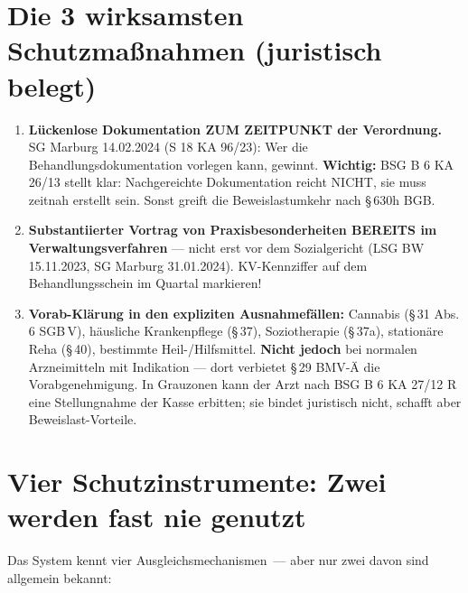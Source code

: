 \documentclass[a4paper]{umbruch-position}
\begin{document}
\newpage
\section{Die 3 wirksamsten Schutzma\ss{}nahmen (juristisch belegt)}

\begin{enumerate}
    \item \textbf{L\"uckenlose Dokumentation ZUM ZEITPUNKT der Verordnung.} SG Marburg 14.02.2024 (S 18 KA 96/23): Wer die Behandlungsdokumentation vorlegen kann, gewinnt. \textbf{Wichtig:} BSG B 6 KA 26/13 stellt klar: Nachgereichte Dokumentation reicht NICHT, sie muss zeitnah erstellt sein. Sonst greift die Beweislastumkehr nach \S\,630h BGB.
    \item \textbf{Substantiierter Vortrag von Praxisbesonderheiten BEREITS im Verwaltungsverfahren} --- nicht erst vor dem Sozialgericht (LSG BW 15.11.2023, SG Marburg 31.01.2024). KV-Kennziffer auf dem Behandlungsschein im Quartal markieren!
    \item \textbf{Vorab-Kl\"arung in den expliziten Ausnahmef\"allen:} Cannabis (\S\,31 Abs.\,6 SGB\,V), h\"ausliche Krankenpflege (\S\,37), Soziotherapie (\S\,37a), station\"are Reha (\S\,40), bestimmte Heil-/Hilfsmittel. \textbf{Nicht jedoch} bei normalen Arzneimitteln mit Indikation --- dort verbietet \S\,29 BMV-\"A die Vorabgenehmigung. In Grauzonen kann der Arzt nach BSG B 6 KA 27/12 R eine Stellungnahme der Kasse erbitten; sie bindet juristisch nicht, schafft aber Beweislast-Vorteile.
\end{enumerate}

\section{Vier Schutzinstrumente: Zwei werden fast nie genutzt}

Das System kennt vier Ausgleichsmechanismen~--- aber nur zwei davon sind allgemein bekannt:
\end{document}
